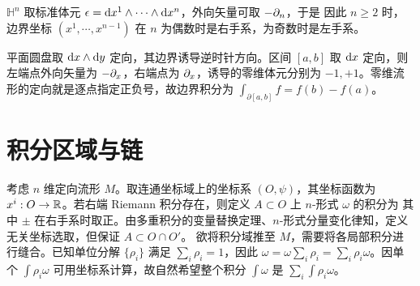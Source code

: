 \begin{example}\label{eg:half-space-orientation}
    $\mathbb H^n$ 取标准体元 $\epsilon=\dd x^1\wedge\cdots\wedge\dd x^n$，外向矢量可取 $-\partial_n$，于是
    因此 $n\geqslant2$ 时，边界坐标 $(x^1,\cdots,x^{n-1})$ 在 $n$ 为偶数时是右手系，为奇数时是左手系。
\end{example}

\begin{example}
    平面圆盘取 $\dd x\wedge\dd y$ 定向，其边界诱导逆时针方向。区间 $[a,b]$ 取 $\dd x$ 定向，则左端点外向矢量为 $-\partial_x$，右端点为 $\partial_x$，诱导的零维体元分别为 $-1,+1$。零维流形的定向就是逐点指定正负号，故边界积分为 $\int_{\partial[a,b]}f=f(b)-f(a)$。
\end{example}

\section{积分区域与链}\label{sec:integration-on-manifold}

考虑 $n$ 维定向流形 $M$。取连通坐标域上的坐标系 $(O,\psi)$，其坐标函数为 $x^i:O\to\mathbb{R}$。若右端 Riemann 积分存在，则定义 $A\subset O$ 上 $n$-形式 $\omega$ 的积分为
其中 $\pm$ 在右手系时取正。由多重积分的变量替换定理、$n$-形式分量变化律知，定义无关坐标选取，但保证 $A\subset O\cap O'$。
欲将积分域推至 $M$，需要将各局部积分进行缝合。已知单位分解 $\{\rho_i\}$ 满足 $\sum_i\rho_i=1$，因此 $\omega=\omega\sum_i\rho_i=\sum_i\rho_i\omega$。因单个 $\int\rho_i\omega$ 可用坐标系计算，故自然希望整个积分 $\int\omega$ 是 $\sum_i\int\rho_i\omega$。


